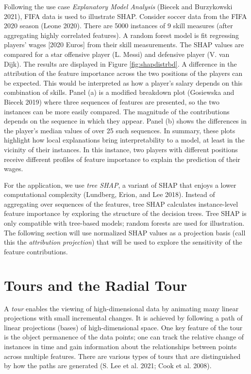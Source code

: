 \documentclass[11pt,twoside]{article}
\begin{document}
Following the use case \emph{Explanatory Model Analysis} (Biecek and Burzykowski 2021), FIFA data is used to illustrate SHAP. Consider soccer data from the FIFA 2020 season (Leone 2020). There are 5000 instances of 9 skill measures (after aggregating highly correlated features). A random forest model is fit regressing players' wages {[}2020 Euros{]} from their skill measurements. The SHAP values are compared for a star offensive player (L. Messi) and defensive player (V. van Dijk). The results are displayed in Figure \ref{fig:shapdistrbd}. A difference in the attribution of the feature importance across the two positions of the players can be expected. This would be interpreted as how a player's salary depends on this combination of skills. Panel (a) is a modified breakdown plot (Gosiewska and Biecek 2019) where three sequences of features are presented, so the two instances can be more easily compared. The magnitude of the contributions depends on the sequence in which they appear. Panel (b) shows the differences in the player's median values of over 25 such sequences. In summary, these plots highlight how local explanations bring interpretability to a model, at least in the vicinity of their instances. In this instance, two players with different positions receive different profiles of feature importance to explain the prediction of their wages.

For the application, we use \emph{tree SHAP}, a variant of SHAP that enjoys a lower computational complexity (Lundberg, Erion, and Lee 2018). Instead of aggregating over sequences of the features, tree SHAP calculates instance-level feature importance by exploring the structure of the decision trees. Tree SHAP is only compatible with tree-based models; random forests are used for illustration. The following section will use normalized SHAP values as a projection basis (call this the \emph{attribution projection}) that will be used to explore the sensitivity of the feature contributions.

\hypertarget{sec:tour}{%
\section{Tours and the Radial Tour}\label{sec:tour}}

A \emph{tour} enables the viewing of high-dimensional data by animating many linear projections with small incremental changes. It is achieved by following a path of linear projections (bases) of high-dimensional space. One key feature of the tour is the object permanence of the data points; one can track the relative change of instances in time and gain information about the relationships between points across multiple features. There are various types of tours that are distinguished by how the paths are generated (S. Lee et al. 2021; Cook et al. 2008).
\end{document}
